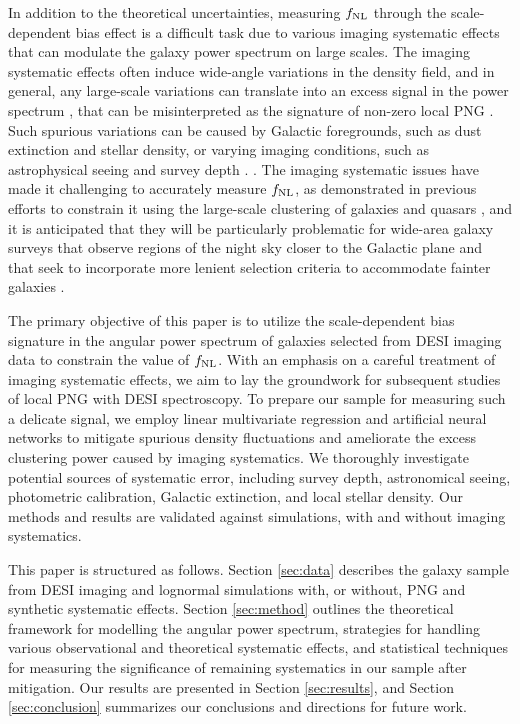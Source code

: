 In addition to the theoretical uncertainties, measuring $f_{\rm NL}$ through the scale-dependent bias effect is a difficult task due to various imaging systematic effects that can modulate the galaxy power spectrum on large scales. The imaging systematic effects often induce wide-angle variations in the density field, and in general, any large-scale variations can translate into an excess signal in the power spectrum \citep[see, e.g.,][]{huterer2013calibration}, that can be misinterpreted as the signature of non-zero local PNG \citep[see, e.g.,][]{PhysRevLett.106.241301}. Such spurious variations can be caused by Galactic foregrounds, such as dust extinction and stellar density, or varying imaging conditions, such as astrophysical seeing and survey depth \citep[see, e.g.,][]{ross2011}.  \citep{2014PhRvL.112x1101B} \citep{2014JCAP...08..039F,2014JCAP...10..035M}. The imaging systematic issues have made it challenging to accurately measure $f_{\rm NL}$, as demonstrated in previous efforts to constrain it using the large-scale clustering of galaxies and quasars \citep[see, e.g.,][]{2013MNRAS.428.1116R,pullen2013systematic, Ho2015JCAP...05..040H}, and it is anticipated that they will be particularly problematic for wide-area galaxy surveys that observe regions of the night sky closer to the Galactic plane and that seek to incorporate more lenient selection criteria to accommodate fainter galaxies \citep[see, e.g,][]{kitanidis2020imaging}.

The primary objective of this paper is to utilize the scale-dependent bias signature in the angular power spectrum of galaxies selected from DESI imaging data to constrain the value of $f_{\rm NL}$. With an emphasis on a careful treatment of imaging systematic effects, we aim to lay the groundwork for subsequent studies of local PNG with DESI spectroscopy. To prepare our sample for measuring such a delicate signal, we employ linear multivariate regression and artificial neural networks to mitigate spurious density fluctuations and ameliorate the excess clustering power caused by imaging systematics. We thoroughly investigate potential sources of systematic error, including survey depth, astronomical seeing, photometric calibration, Galactic extinction, and local stellar density. Our methods and results are validated against simulations, with and without imaging systematics.

This paper is structured as follows. Section \ref{sec:data} describes the galaxy sample from DESI imaging and lognormal simulations with, or without, PNG and synthetic systematic effects. Section \ref{sec:method} outlines the theoretical framework for modelling the angular power spectrum, strategies for handling various observational and theoretical systematic effects, and statistical techniques for measuring the significance of remaining systematics in our sample after mitigation. Our results are presented in Section \ref{sec:results}, and Section \ref{sec:conclusion} summarizes our conclusions and directions for future work.